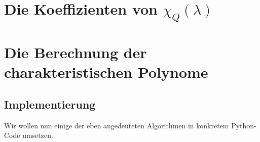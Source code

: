     \section{Die Koeffizienten von $\chi_Q(\lambda)$}

    \section{Die Berechnung der charakteristischen Polynome}

        \subsection{Implementierung}

            Wir wollen nun einige der eben angedeuteten Algorithmen in konkretem Python-Code umsetzen.
